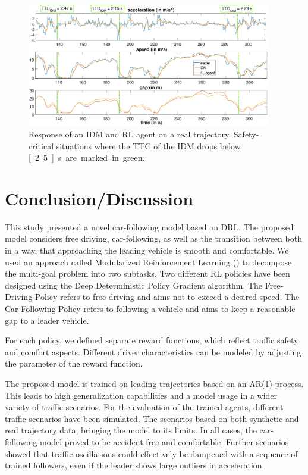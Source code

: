\documentclass[review]{elsarticle}
\providecommand{\3}{{\ss}}
\begin{document}
\begin{figure}	
	\centering
	\includegraphics[width=0.95\textwidth]{images/TTC_CaseStudy}
	\caption{Response of an IDM and RL agent on a real trajectory. Safety-critical situations where the TTC of the IDM drops below \unit[2.5]{s} are marked in green.}
	\label{fig:TTC_CaseStudy}
\end{figure}

\section{Conclusion/Discussion}
\label{sec:conclusion}
This study presented a novel car-following model based on DRL. The proposed model considers free driving, car-following, as well as the transition between both in a way, that approaching the leading vehicle is smooth and comfortable. We used an approach called Modularized Reinforcement Learning (\cite{MRL}) to decompose the multi-goal problem into two subtasks. Two different RL policies have been designed using the Deep Deterministic Policy Gradient algorithm. The Free-Driving Policy refers to free driving and aims not to exceed a desired speed. The Car-Following Policy refers to following a vehicle and aims to keep a reasonable gap to a leader vehicle.

For each policy, we defined separate reward functions, which reflect traffic safety and comfort aspects. 
Different driver characteristics can be modeled by adjusting the parameter of the reward function.

The proposed model is trained on leading trajectories based on an AR(1)-process. This leads to high generalization capabilities and a model usage in a wider variety of traffic scenarios. 
For the evaluation of the trained agents, different traffic scenarios
have been simulated. The scenarios based on both synthetic and
real trajectory data, bringing the model to its limits. 
In all cases, the car-following model proved to be accident-free and comfortable. Further scenarios showed that traffic oscillations could effectively be dampened with a sequence of trained followers, even if the leader shows large outliers in acceleration.





\end{document}
